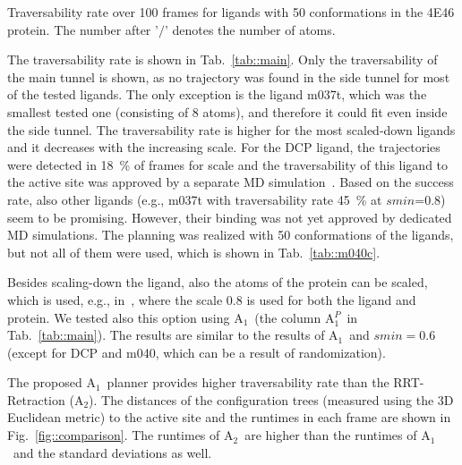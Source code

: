\documentclass{bmcart}
\def\RA{A$_{1}$}
\def\RB{A$_{2}$}
\def\RD{A$_1^P$}
\begin{document}
\begin{table}[bt]
\centering
\caption{\label{tab::main}
    \small
    Traversability rate over 100 frames for ligands with 50 conformations in the 4E46 protein.
    The number after '$/$' denotes the number of atoms.
}
\small
\renewcommand{\tabcolsep}{2pt}
{
\scriptsize
}
\end{table}

The traversability rate is shown in Tab.~\ref{tab::main}. 
Only the traversability of the main tunnel is shown, as no trajectory was found in the side tunnel for most of the tested ligands.
The only exception is the ligand m037t, which was the smallest tested one (consisting of 8 atoms), and therefore it could fit even inside the side tunnel.
The traversability rate is higher for the most scaled-down ligands  and it decreases with the increasing scale.
For the DCP ligand, the trajectories were detected in 18~\% of frames for scale and the traversability of this ligand
to the active site was approved by a separate MD simulation~\cite{marques2017catalytic}.
Based on the success rate, also other ligands (e.g., m037t with traversability rate 45~\% at $smin$=0.8) seem to be promising.
However, their binding was not yet approved by dedicated MD simulations.
The planning was realized with 50 conformations of the ligands, but not all of them were used, which is shown in Tab.~\ref{tab::m040c}.

Besides scaling-down the ligand, also the atoms of the protein can be scaled, which is used, e.g., in~\cite{cortes2005path}, where the scale 0.8 is used for both the ligand and protein.
We tested also this option using \RA\ (the column \RD\ in Tab.~\ref{tab::main}).
The results are similar to the results of \RA\ and $smin=0.6$ (except for DCP and m040, which can be a result of randomization).

The proposed \RA\ planner provides higher traversability rate than the RRT-Retraction (\RB).
The distances of the configuration trees (measured using the 3D Euclidean metric) to the active site and the runtimes in each frame
are shown in Fig.~\ref{fig::comparison}.
The runtimes of \RB\ are higher than the runtimes of \RA\ and the standard deviations as well.
\end{document}
